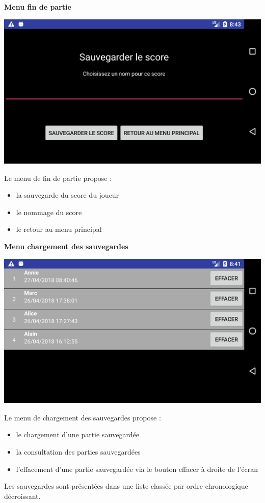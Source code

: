 \documentclass{article}
\begin{document}
\bigskip

\textbf{Menu fin de partie}
\begin{center}
  \includegraphics[scale=0.25]{GameOverActivity.png}
\end{center}
Le menu de fin de partie propose :
\begin{itemize}
\item la sauvegarde du score du joueur
\item le nommage du score
\item le retour au menu principal
\end{itemize}

\bigskip

\textbf{Menu chargement des sauvegardes}
\begin{center}
  \includegraphics[scale=0.25]{LoadSaveActivity.png}
\end{center}
Le menu de chargement des sauvegardes propose :
\begin{itemize}
\item le chargement d'une partie sauvegardée
\item la consultation des parties sauvegardées
\item l'effacement d'une partie sauvegardée via le bouton effacer à droite de l'écran
\end{itemize}
Les sauvegardes sont présentées dans une liste classée par ordre chronologique décroissant.
\end{document}
